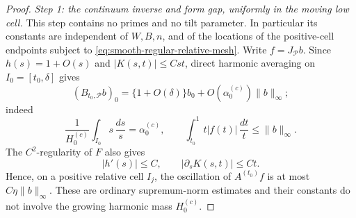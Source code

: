 \documentclass[11pt]{article}
\numberwithin{equation}{section}
\theoremstyle{definition}
\theoremstyle{remark}
\newcommand{\1}{\mathbf 1}
\begin{document}
\begin{proof}
\emph{Step 1: the continuum inverse and form gap, uniformly in the
moving low cell.}\quad
This step contains no primes and no tilt parameter.  In particular its
constants are independent of \(W,B,n\), and of the locations of the
positive-cell endpoints subject to
\eqref{eq:smooth-regular-relative-mesh}.
Write \(f=J_{\mathcal P}b\).  Since \(h(s)=1+O(s)\) and
\(|K(s,t)|\leq Cst\), direct harmonic averaging on
\(I_0=[t_0,\delta]\) gives
\begin{equation}
 (B_{t_0,\mathcal P}b)_0
 =\{1+O(\delta)\}b_0+
 O\!\left(\alpha_0^{(c)}\right)\|b\|_\infty;
 \label{eq:smooth-low-row}
\end{equation}
indeed
\[
 \frac1{H_0^{(c)}}\int_{I_0}s\,\frac{ds}{s}
   =\alpha_0^{(c)},\qquad
 \int_{t_0}^1t|f(t)|\,\frac{dt}{t}\leq\|b\|_\infty.
\]
The \(C^2\)-regularity of \(F\) also gives
\[
 |h'(s)|\leq C,\qquad |\partial_sK(s,t)|\leq Ct.
\]
Hence, on a positive relative cell \(I_j\), the oscillation of
\(A^{(t_0)}f\) is at most \(C\eta\|b\|_\infty\).  These are ordinary
supremum-norm estimates and their constants do not involve the growing
harmonic mass \(H_0^{(c)}\).


\end{proof}
\end{document}
